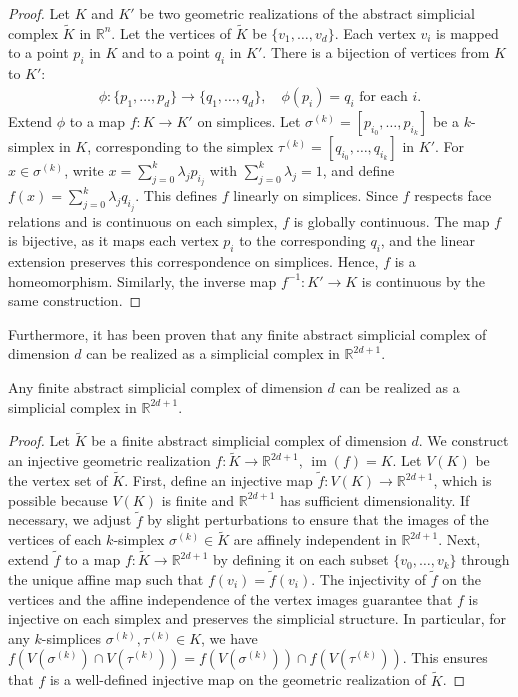 \begin{proof}
Let $K$ and $K'$ be two geometric realizations of the abstract simplicial complex $\tilde{K}$ in $\mathbb{R}^n$. Let the vertices of $\tilde{K}$ be $\{v_1, \dots, v_d\}$. Each vertex $v_i$ is mapped to a point $p_i$ in $K$ and to a point $q_i$ in $K'$. There is a bijection of vertices from $K$ to $K'$: 
\begin{align}
\phi: \{p_1, \dots, p_d\} \to \{q_1, \dots, q_d\}, \quad \phi(p_i) = q_i \text{ for each } i.
\end{align}
Extend $\phi$ to a map $f: K \to K'$ on simplices. Let $\sigma^{(k)} = [p_{i_0}, \dots, p_{i_{k}}]$ be a $k$-simplex in $K$, corresponding to the simplex $\tau^{(k)} = [q_{i_0}, \dots, q_{i_{k}}]$ in $K'$. For $x \in \sigma^{(k)}$, write $x = \sum_{j=0}^{k} \lambda_j p_{i_j}$ with $\sum_{j=0}^{k} \lambda_j = 1$, and define $f(x) = \sum_{j=0}^{k} \lambda_j q_{i_j}$. This defines $f$ linearly on simplices. Since $f$ respects face relations and is continuous on each simplex, $f$ is globally continuous. The map $f$ is bijective, as it maps each vertex $p_i$ to the corresponding $q_i$, and the linear extension preserves this correspondence on simplices. Hence, $f$ is a homeomorphism. Similarly, the inverse map $f^{-1}: K' \to K$ is continuous by the same construction.
\end{proof}

Furthermore, it has been proven that any finite abstract simplicial complex of dimension
$d$ can be realized as a simplicial complex in $\mathbb{R}^{2d+1}$.

\begin{theorem}
Any finite abstract simplicial complex of dimension $d$ can be realized as a simplicial complex in $\mathbb{R}^{2d+1}$.
\end{theorem}

\begin{proof}
Let $\tilde{K}$ be a finite abstract simplicial complex of dimension $d$. We construct an injective geometric realization $f: \tilde{K} \to \mathbb{R}^{2d+1}$, $\operatorname{im}(f) = K$.  Let $V(K)$ be the vertex set of $\tilde{K}$. First, define an injective map $\tilde{f}: V(K) \to \mathbb{R}^{2d+1}$, which is possible because $V(K)$ is finite and $\mathbb{R}^{2d+1}$ has sufficient dimensionality. If necessary, we adjust $\tilde{f}$ by slight perturbations to ensure that the images of the vertices of each $k$-simplex $\sigma^{(k)} \in \tilde{K}$ are affinely independent in $\mathbb{R}^{2d+1}$. Next, extend $\tilde{f}$ to a map $f: \tilde{K} \to \mathbb{R}^{2d+1}$ by defining it on each subset $\{v_0, \dots, v_k\}$ through the unique affine map such that $f(v_i) = \tilde{f}(v_i)$. The injectivity of $\tilde{f}$ on the vertices and the affine independence of the vertex images guarantee that $f$ is injective on each simplex and preserves the simplicial structure. In particular, for any $k$-simplices $\sigma^{(k)}, \tau^{(k)} \in K$, we have $f(V(\sigma^{(k)}) \cap V(\tau^{(k)})) = f(V(\sigma^{(k)})) \cap f(V(\tau^{(k)}))$. This ensures that $f$ is a well-defined injective map on the geometric realization of $\tilde{K}$.
\end{proof}

